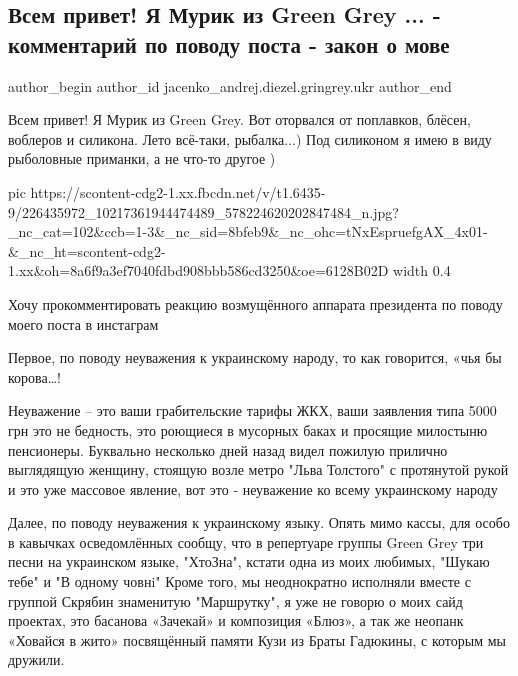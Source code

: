  
 
 
 
 
 
\subsection{Всем привет! Я Мурик из Green Grey ... - комментарий по поводу поста - закон о мове}
\label{sec:30_07_2021.fb.jacenko_andrej.diezel.gringrey.ukr.1.kommentarij_zakon_mova}
 
\ifcmt
 author_begin
   author_id jacenko_andrej.diezel.gringrey.ukr
 author_end
\fi

Всем привет! Я Мурик из Green Grey. Вот оторвался от поплавков, блёсен,
воблеров и силикона. Лето всё-таки, рыбалка...) Под силиконом я имею в виду
рыболовные приманки, а не что-то другое )

\ifcmt
  pic https://scontent-cdg2-1.xx.fbcdn.net/v/t1.6435-9/226435972_10217361944474489_578224620202847484_n.jpg?_nc_cat=102&ccb=1-3&_nc_sid=8bfeb9&_nc_ohc=tNxEspruefgAX_4x01-&_nc_ht=scontent-cdg2-1.xx&oh=8a6f9a3ef7040fdbd908bbb586cd3250&oe=6128B02D
  width 0.4
\fi

Хочу прокомментировать реакцию возмущённого аппарата президента по поводу моего
поста в инстаграм

Первое, по поводу неуважения к украинскому народу, то как говорится, «чья бы
корова…!

Неуважение – это ваши грабительские тарифы ЖКХ, ваши заявления типа 5000 грн
это не бедность, это роющиеся в мусорных баках и просящие милостыню
пенсионеры. Буквально несколько дней назад видел пожилую прилично выглядящую
женщину, стоящую возле метро "Льва Толстого" с протянутой рукой и это уже
массовое явление, вот это - неуважение ко всему украинскому народу

Далее, по поводу неуважения к украинскому языку. Опять мимо кассы, для особо в
кавычках осведомлённых сообщу, что в репертуаре группы Green Grey три песни на
украинском языке, "ХтоЗна", кстати одна из моих любимых, "Шукаю тебе" и "В
одному човнi" Кроме того, мы неоднократно исполняли вместе с группой Скрябин
знаменитую "Маршрутку", я уже не говорю о моих сайд проектах, это басанова
«Зачекай» и композиция «Блюз», а так же неопанк «Ховайся в жито» посвящённый
памяти Кузи из Браты Гадюкины, с которым мы дружили.

